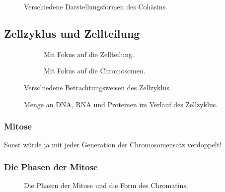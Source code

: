 
\begin{figure}[H]
    \caption{Verschiedene Darstellungsformen des Cohäsins.}
\end{figure}
\subsection{Zellzyklus und Zellteilung}

\begin{figure}[H]
    \begin{subfigure}[t]{0.45\textwidth}
        \centering
        \caption{Mit Fokus auf die Zellteilung.}
    \end{subfigure}
    \hfill
    \begin{subfigure}[t]{0.45\textwidth}
        \centering
        \caption{Mit Fokus auf die Chromosomen.}
    \end{subfigure}
    \caption{Verschiedene Betrachtungsweisen des Zellzyklus.}
\end{figure}


\begin{figure}[H]
    \caption{Menge an DNA, RNA und Proteinen im Verlauf des Zellzyklus.}
\end{figure}


\subsubsection{Mitose}

Sonst würde ja mit jeder Generation der Chromosomensatz verdoppelt!

\subsubsection*{Die Phasen der Mitose}

\begin{figure}[H]
    \caption{Die Phasen der Mitose und die Form des Chromatins.}
\end{figure}


